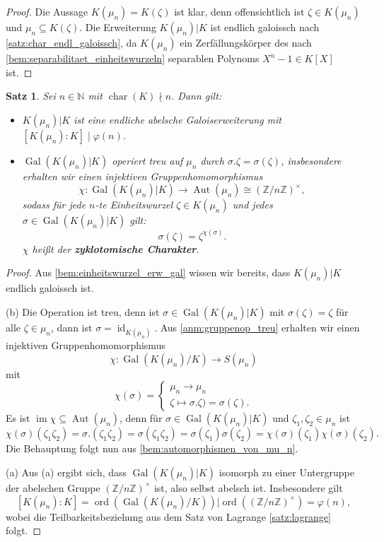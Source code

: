 \documentclass[a4paper, twoside, 11pt, ngerman]{report}
\newcommand{\NN}{\mathds N}
\newcommand{\ZZ}{\mathds Z}
\DeclareMathOperator{\Aut}{Aut}
\DeclareMathOperator{\charact}{char}
\DeclareMathOperator{\Gal}{Gal}
\DeclareMathOperator{\ident}{id}
\DeclareMathOperator{\image}{im}
\DeclareMathOperator{\ord}{ord}
\theoremstyle{definistyle}
\newtheorem{satz}{Satz}[section]
\theoremstyle{remark}
\newcommand{\defn}[1]{\textit{\bfseries #1}}
\begin{document}
\begin{proof}
Die Aussage $K(\mu_n) = K(\zeta)$ ist klar, denn offensichtlich ist $\zeta\in K(\mu_n)$
und $\mu_n\subseteq K(\zeta)$. Die Erweiterung $K(\mu_n)|K$ ist endlich galoissch nach \ref{satz:char_endl_galoissch}, da $K(\mu_n)$ ein Zerfällungskörper des nach \ref{bem:separabilitaet_einheitswurzeln} separablen Polynoms $X^n - 1 \in K[X]$ ist.
\end{proof}




\begin{satz}\label{satz:zyklotomischer_charakter}
Sei $n \in \NN$ mit $\charact(K) \nmid n$. Dann gilt:
\begin{itemize}
    \item[(a)] $K(\mu_n)|K$ ist eine endliche abelsche Galoiserweiterung mit $[K(\mu_n) : K] \mid\varphi(n)$.
    \item[(b)] $\Gal(K(\mu_n)|K)$ operiert treu auf $\mu_n$ durch $\sigma.\zeta =\sigma(\zeta)$, insbesondere erhalten wir einen injektiven Gruppenhomomorphismus
    \[
    \chi \colon \Gal(K(\mu_n) | K) \to \Aut(\mu_n) \cong (\ZZ / n \ZZ)^\times,
    \]
    sodass für jede $n$-te Einheitswurzel $\zeta \in K(\mu_n)$ und jedes $\sigma \in \Gal(K(\mu_n)| K)$ gilt:
    \[
    \sigma(\zeta) = \zeta^{\chi(\sigma)}.
    \]
    $\chi$ heißt der \defn{zyklotomische Charakter}.
\end{itemize}
\end{satz}

\begin{proof} Aus \ref{bem:einheitswurzel_erw_gal} wissen wir bereits, dass $K(\mu_n)|K$
endlich galoissch ist.

(b) Die Operation ist treu, denn ist $\sigma \in \Gal(K(\mu_n)| K)$ mit $\sigma(\zeta) = \zeta$ für alle $\zeta \in \mu_n$, dann ist $\sigma = \ident_{K(\mu_n)}$. 
Aus \ref{anm:gruppenop_treu} erhalten wir einen injektiven Gruppenhomomorphismus
\[
\chi \colon \Gal(K(\mu_n) / K) \to S(\mu_n)
\]
mit
\[
\chi(\sigma) = 
\begin{cases}
\mu_n \to \mu_n \\ \zeta \mapsto \sigma.\zeta) = \sigma(\zeta).
\end{cases}
\]
Es ist $\image \chi\subseteq\Aut(\mu_n)$, denn für $\sigma\in\Gal(K(\mu_n)|K)$
und $\zeta_1,\zeta_2\in\mu_n$ ist
\[
\chi(\sigma)(\zeta_1\zeta_2)=\sigma.(\zeta_1 \zeta_2) = \sigma(\zeta_1\zeta_2)=\sigma(\zeta_1) \sigma(\zeta_2)
=\chi(\sigma)(\zeta_1)\chi(\sigma)(\zeta_2).
\]
Die Behauptung folgt nun aus \ref{bem:automorphismen_von_mu_n}.

(a) Aus (a) ergibt sich, dass $\Gal(K(\mu_n)|K)$ isomorph zu einer Untergruppe der
abelschen Gruppe $(\ZZ / n \ZZ)^\times$ ist, also selbst abelsch ist. Insbesondere gilt
\[
[K(\mu_n) : K] = \ord(\Gal(K(\mu_n) / K)) | \ord((\ZZ / n \ZZ)^\times) = \varphi(n),
\]
wobei die Teilbarkeitsbeziehung aus dem Satz von Lagrange \ref{satz:lagrange} folgt.
\end{proof}
\end{document}
